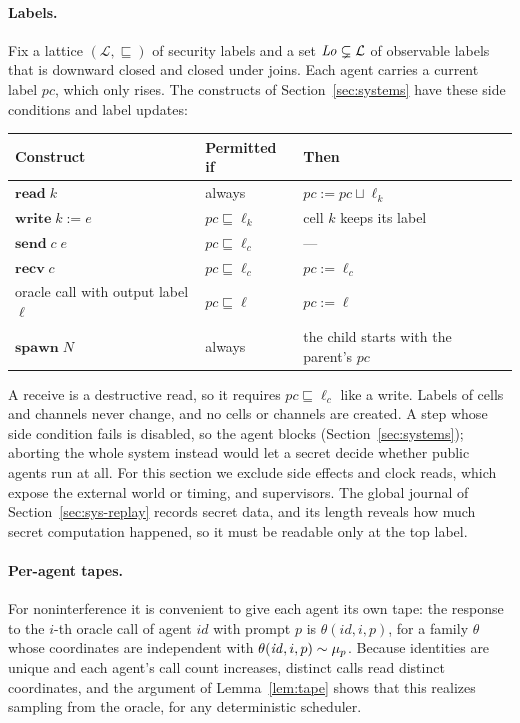 \paragraph{Labels.}
Fix a lattice $(\mathcal{L}, \sqsubseteq)$ of security labels and a set $\mathit{Lo} \subsetneq
\mathcal{L}$ of observable labels that is downward closed and closed under joins.
Each agent carries a current label $\mathit{pc}$, which only rises.
The constructs of Section~\ref{sec:systems} have these side conditions and label updates:
\begin{center}
\small
\begin{tabular}{@{}lll@{}}
\toprule
\textbf{Construct} & \textbf{Permitted if} & \textbf{Then} \\
\midrule
$\mathbf{read}\;k$ & always & $\mathit{pc} := \mathit{pc} \sqcup \ell_k$ \\
$\mathbf{write}\;k := e$ & $\mathit{pc} \sqsubseteq \ell_k$ & cell $k$ keeps its label \\
$\mathbf{send}\;c\;e$ & $\mathit{pc} \sqsubseteq \ell_c$ & --- \\
$\mathbf{recv}\;c$ & $\mathit{pc} \sqsubseteq \ell_c$ & $\mathit{pc} := \ell_c$ \\
oracle call with output label $\ell$ & $\mathit{pc} \sqsubseteq \ell$ & $\mathit{pc} := \ell$ \\
$\mathbf{spawn}\;N$ & always & the child starts with the parent's $\mathit{pc}$ \\
\bottomrule
\end{tabular}
\end{center}
A receive is a destructive read, so it requires $\mathit{pc} \sqsubseteq \ell_c$ like a write.
Labels of cells and channels never change, and no cells or channels are created.
A step whose side condition fails is disabled, so the agent blocks
(Section~\ref{sec:systems}); aborting the whole system instead would let a secret decide whether
public agents run at all.
For this section we exclude side effects and clock reads, which expose the external world or
timing, and supervisors.
The global journal of Section~\ref{sec:sys-replay} records secret data, and its length reveals
how much secret computation happened, so it must be readable only at the top label.

\paragraph{Per-agent tapes.}
For noninterference it is convenient to give each agent its own tape: the response to the
$i$-th oracle call of agent $\mathit{id}$ with prompt $p$ is $\theta(\mathit{id}, i, p)$, for
a family $\theta$ whose coordinates are independent with $\theta(\mathit{id},i,p) \sim
\mu_{p}$.
Because identities are unique and each agent's call count increases, distinct calls read
distinct coordinates, and the argument of Lemma~\ref{lem:tape} shows that this realizes
sampling from the oracle, for any deterministic scheduler.

